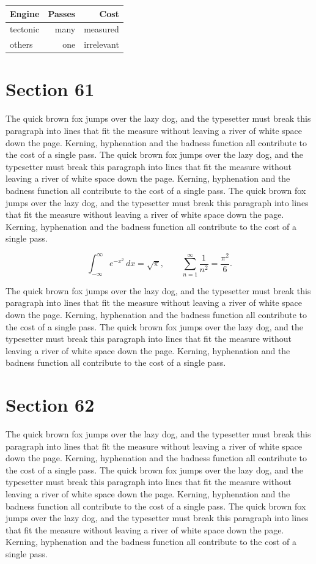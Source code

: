 \documentclass{article}
\begin{document}
\begin{center}
\begin{tabular}{lrr}
\toprule
Engine & Passes & Cost \\
\midrule
tectonic & many & measured \\
others & one & irrelevant \\
\bottomrule
\end{tabular}
\end{center}

\section{Section 61}
The quick brown fox jumps over the lazy dog, and the typesetter must break this paragraph into lines that fit the measure without leaving a river of white space down the page. Kerning, hyphenation and the badness function all contribute to the cost of a single pass. The quick brown fox jumps over the lazy dog, and the typesetter must break this paragraph into lines that fit the measure without leaving a river of white space down the page. Kerning, hyphenation and the badness function all contribute to the cost of a single pass. The quick brown fox jumps over the lazy dog, and the typesetter must break this paragraph into lines that fit the measure without leaving a river of white space down the page. Kerning, hyphenation and the badness function all contribute to the cost of a single pass. 

\begin{equation}
\int_{-\infty}^{\infty} e^{-x^{2}}\,dx = \sqrt{\pi}, \qquad
\sum_{n=1}^{\infty} \frac{1}{n^{2}} = \frac{\pi^{2}}{6}.
\end{equation}

The quick brown fox jumps over the lazy dog, and the typesetter must break this paragraph into lines that fit the measure without leaving a river of white space down the page. Kerning, hyphenation and the badness function all contribute to the cost of a single pass. The quick brown fox jumps over the lazy dog, and the typesetter must break this paragraph into lines that fit the measure without leaving a river of white space down the page. Kerning, hyphenation and the badness function all contribute to the cost of a single pass. 
\section{Section 62}
The quick brown fox jumps over the lazy dog, and the typesetter must break this paragraph into lines that fit the measure without leaving a river of white space down the page. Kerning, hyphenation and the badness function all contribute to the cost of a single pass. The quick brown fox jumps over the lazy dog, and the typesetter must break this paragraph into lines that fit the measure without leaving a river of white space down the page. Kerning, hyphenation and the badness function all contribute to the cost of a single pass. The quick brown fox jumps over the lazy dog, and the typesetter must break this paragraph into lines that fit the measure without leaving a river of white space down the page. Kerning, hyphenation and the badness function all contribute to the cost of a single pass. 
\end{document}
